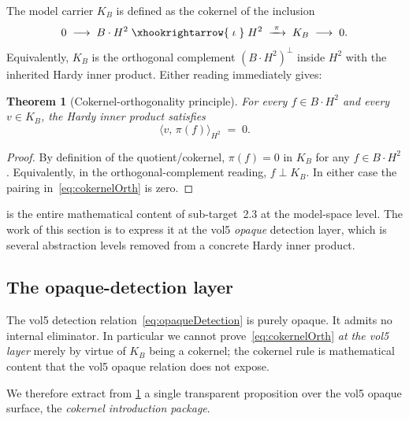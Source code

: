 \documentclass[12pt]{article}
\newtheorem{theorem}{Theorem}[section]
\theoremstyle{definition}
\theoremstyle{remark}
\newcommand{\HardyTwo}{H^{2}}
\newcommand{\BS}{B}
\newcommand{\KB}{K_{B}}
\newcommand{\inn}[2]{\langle #1,\, #2 \rangle}
\begin{document}
The model carrier $\KB$ is defined as the cokernel of the inclusion
\begin{equation}\label{eq:cokernelExact}
  0 \;\longrightarrow\; B \cdot \HardyTwo \;\xhookrightarrow{\;\iota\;}\; \HardyTwo \;\xrightarrow{\;\pi\;}\; \KB \;\longrightarrow\; 0.
\end{equation}
Equivalently, $\KB$ is the orthogonal complement $(B \cdot \HardyTwo)^{\perp}$ inside $\HardyTwo$ with the inherited Hardy inner product. Either reading immediately gives:

\begin{theorem}[Cokernel-orthogonality principle]\label{thm:cokernelPrinciple}
For every $f \in B \cdot \HardyTwo$ and every $v \in \KB$, the Hardy inner product satisfies
\begin{equation}\label{eq:cokernelOrth}
  \inn{v}{\pi(f)}_{H^{2}} \;=\; 0.
\end{equation}
\end{theorem}

\begin{proof}
By definition of the quotient/cokernel, $\pi(f) = 0$ in $\KB$ for any $f \in \BS \cdot \HardyTwo$. Equivalently, in the orthogonal-complement reading, $f \perp \KB$. In either case the pairing in~\eqref{eq:cokernelOrth} is zero.
\end{proof}

 is the entire mathematical content of sub-target~2.3 at the model-space level. The work of this section is to express it at the vol5 \emph{opaque} detection layer, which is several abstraction levels removed from a concrete Hardy inner product.

\subsection{The opaque-detection layer}\label{subsec:opaqueLayer}

The vol5 detection relation~\eqref{eq:opaqueDetection} is purely opaque. It admits no internal eliminator. In particular we cannot prove~\eqref{eq:cokernelOrth} \emph{at the vol5 layer} merely by virtue of $\KB$ being a cokernel; the cokernel rule is mathematical content that the vol5 opaque relation does not expose.

We therefore extract from \cref{thm:cokernelPrinciple} a single transparent proposition over the vol5 opaque surface, the \emph{cokernel introduction package}.
\end{document}
